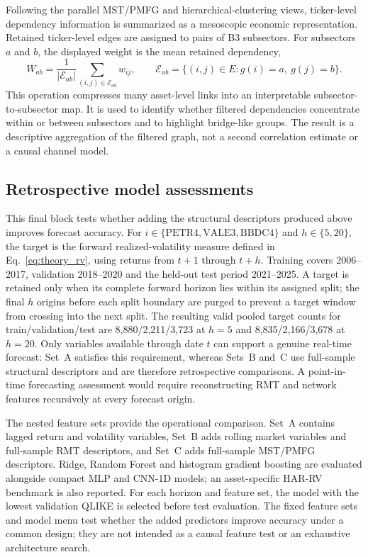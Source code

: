 \label{subsec:subsector_network_method}

Following the parallel MST/PMFG and hierarchical-clustering views, ticker-level dependency information is summarized as a mesoscopic economic representation. Retained ticker-level edges are assigned to pairs of B3 subsectors. For subsectors $a$ and $b$, the displayed weight is the mean retained dependency,
\begin{equation}
W_{ab}=\frac{1}{|\mathcal{E}_{ab}|}\sum_{(i,j)\in\mathcal{E}_{ab}}w_{ij},
\qquad \mathcal{E}_{ab}=\{(i,j)\in E:g(i)=a,\ g(j)=b\}.
\end{equation}
This operation compresses many asset-level links into an interpretable subsector-to-subsector map. It is used to identify whether filtered dependencies concentrate within or between subsectors and to highlight bridge-like groups. The result is a descriptive aggregation of the filtered graph, not a second correlation estimate or a causal channel model.

\subsection{Retrospective model assessments}
\label{subsec:experimental_framework}
\label{subsec:forecast_metrics}
\label{subsec:evaluation_method}

This final block tests whether adding the structural descriptors produced above improves forecast accuracy. For $i\in\{\mathrm{PETR4},\mathrm{VALE3},\mathrm{BBDC4}\}$ and $h\in\{5,20\}$, the target is the forward realized-volatility measure defined in Eq.~\eqref{eq:theory_rv}, using returns from $t+1$ through $t+h$. Training covers 2006--2017, validation 2018--2020 and the held-out test period 2021--2025. A target is retained only when its complete forward horizon lies within its assigned split; the final $h$ origins before each split boundary are purged to prevent a target window from crossing into the next split. The resulting valid pooled target counts for train/validation/test are 8,880/2,211/3,723 at $h=5$ and 8,835/2,166/3,678 at $h=20$. Only variables available through date $t$ can support a genuine real-time forecast: Set~A satisfies this requirement, whereas Sets~B and~C use full-sample structural descriptors and are therefore retrospective comparisons. A point-in-time forecasting assessment would require reconstructing RMT and network features recursively at every forecast origin.

The nested feature sets provide the operational comparison. Set~A contains lagged return and volatility variables, Set~B adds rolling market variables and full-sample RMT descriptors, and Set~C adds full-sample MST/PMFG descriptors. Ridge, Random Forest and histogram gradient boosting are evaluated alongside compact MLP and CNN-1D models; an asset-specific HAR-RV benchmark is also reported. For each horizon and feature set, the model with the lowest validation QLIKE is selected before test evaluation. The fixed feature sets and model menu test whether the added predictors improve accuracy under a common design; they are not intended as a causal feature test or an exhaustive architecture search.

